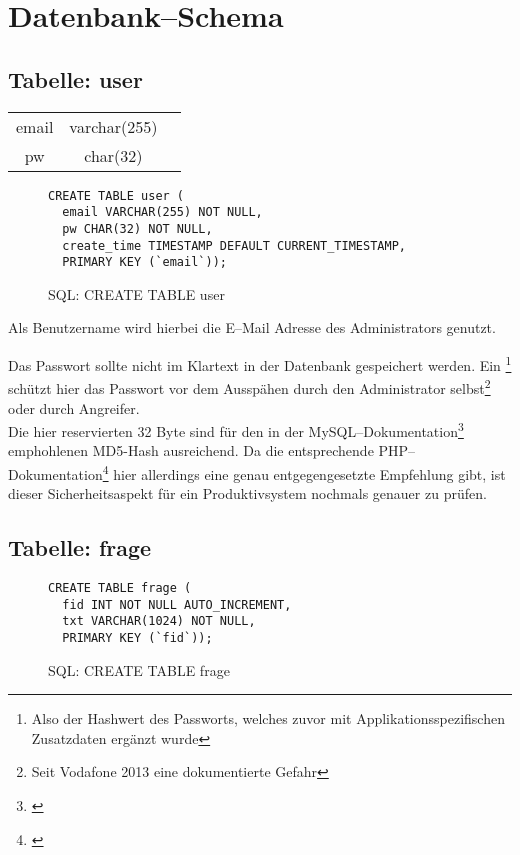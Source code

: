\section{Datenbank--Schema}

\subsection{Tabelle: user}
\begin{center}
\begin{supertabular}{c|c|c}
\hline
email & varchar(255) &  \\
pw & char(32) &  \\
\end{supertabular}
\end{center}


\begin{figure}[h]
\begin{verbatim}
CREATE TABLE user (
  email VARCHAR(255) NOT NULL,
  pw CHAR(32) NOT NULL,
  create_time TIMESTAMP DEFAULT CURRENT_TIMESTAMP,
  PRIMARY KEY (`email`));
\end{verbatim}
\caption{SQL: CREATE TABLE user}
\label{sql:tbluser}
\end{figure}

Als Benutzername wird hierbei die E--Mail Adresse des Administrators genutzt. 

Das Passwort sollte nicht im Klartext in der Datenbank gespeichert werden. Ein \footnote{Also der Hashwert des Passworts, welches zuvor mit Applikationsspezifischen Zusatzdaten ergänzt wurde} schützt hier das Passwort vor dem Ausspähen durch den Administrator selbst\footnote{Seit Vodafone 2013 eine dokumentierte Gefahr} oder durch Angreifer.\\
Die hier reservierten 32 Byte sind für den in der MySQL--Dokumentation\footnote{\cite{mysql-pcrypt}} emphohlenen MD5-Hash ausreichend. Da die entsprechende PHP--Dokumentation\footnote{\cite{php-pcrypt}} hier allerdings eine genau entgegengesetzte Empfehlung gibt, ist dieser Sicherheitsaspekt für ein Produktivsystem nochmals genauer zu prüfen.

\subsection{Tabelle: frage}
\begin{figure}[h]
\begin{verbatim}
CREATE TABLE frage (
  fid INT NOT NULL AUTO_INCREMENT,
  txt VARCHAR(1024) NOT NULL,
  PRIMARY KEY (`fid`));
\end{verbatim}
\caption{SQL: CREATE TABLE frage}
\label{sql:tblfrage}
\end{figure}

